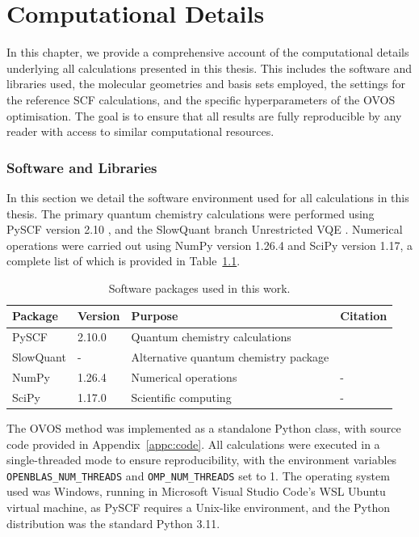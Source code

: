 \chapter{Computational Details}
\label{ch:computational}

In this chapter, we provide a comprehensive account of the computational details underlying all calculations presented in this thesis. This includes the software and libraries used, the molecular geometries and basis sets employed, the settings for the reference SCF calculations, and the specific hyperparameters of the OVOS optimisation. The goal is to ensure that all results are fully reproducible by any reader with access to similar computational resources.


\subsection{Software and Libraries}
\label{subsec:comp_calc_set_software}

In this section we detail the software environment used for all calculations in this thesis. The primary quantum chemistry calculations were performed using PySCF version 2.10 \cite{Sun2020}, and the SlowQuant branch Unrestricted VQE \cite{Kjellgren2026}. Numerical operations were carried out using NumPy version 1.26.4 and SciPy version 1.17, a complete list of which is provided in Table~\ref{tab:software}.

\begin{table}[H]
    \centering
    \caption{Software packages used in this work.}
    \label{tab:software}
    \begin{tabular}{llll}
        \toprule
        Package & Version & Purpose & Citation \\
        \midrule
        PySCF & 2.10.0 & Quantum chemistry calculations & \cite{Sun2020} \\
        SlowQuant & - & Alternative quantum chemistry package & \cite{Kjellgren2026} \\
        NumPy & 1.26.4 & Numerical operations & - \\
        SciPy & 1.17.0 & Scientific computing & - \\
        \bottomrule
    \end{tabular}
\end{table}

The OVOS method was implemented as a standalone Python class, with source code provided in Appendix~\ref{appc:code}. All calculations were executed in a single-threaded mode to ensure reproducibility, with the environment variables \texttt{OPENBLAS\_NUM\_THREADS} and \texttt{OMP\_NUM\_THREADS} set to 1. The operating system used was Windows, running in Microsoft Visual Studio Code's WSL Ubuntu virtual machine, as PySCF requires a Unix-like environment, and the Python distribution was the standard Python 3.11.

